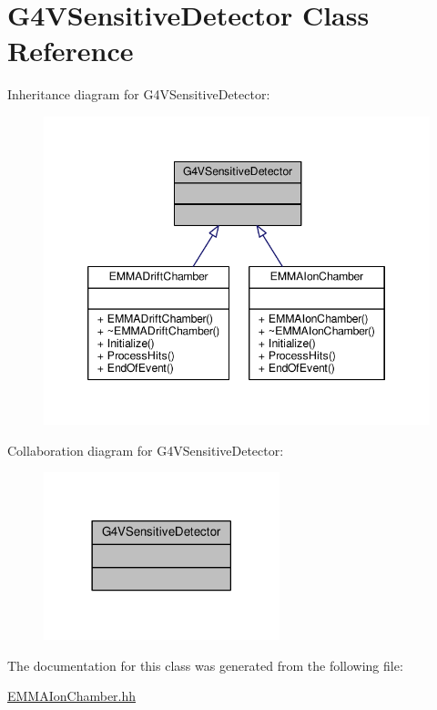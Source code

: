 \hypertarget{classG4VSensitiveDetector}{}\section{G4\+V\+Sensitive\+Detector Class Reference}
\label{classG4VSensitiveDetector}


Inheritance diagram for G4\+V\+Sensitive\+Detector\+:
\nopagebreak
\begin{figure}[H]
\begin{center}
\leavevmode
\includegraphics[width=346pt]{classG4VSensitiveDetector__inherit__graph}
\end{center}
\end{figure}


Collaboration diagram for G4\+V\+Sensitive\+Detector\+:
\nopagebreak
\begin{figure}[H]
\begin{center}
\leavevmode
\includegraphics[width=194pt]{classG4VSensitiveDetector__coll__graph}
\end{center}
\end{figure}


The documentation for this class was generated from the following file\+:\begin{DoxyCompactItemize}
\item 
\hyperlink{EMMAIonChamber_8hh}{E\+M\+M\+A\+Ion\+Chamber.\+hh}\end{DoxyCompactItemize}
